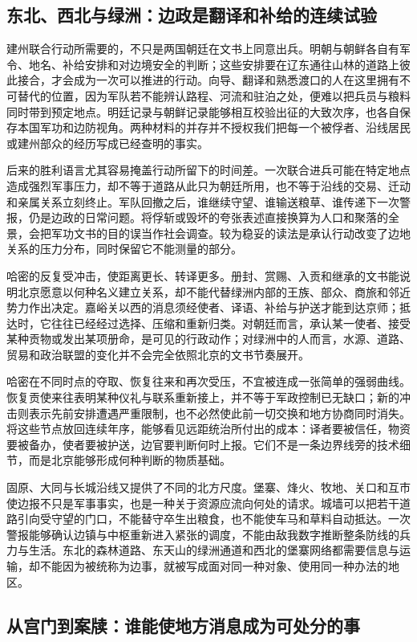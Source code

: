 \subsection{东北、西北与绿洲：边政是翻译和补给的连续试验}

建州联合行动所需要的，不只是两国朝廷在文书上同意出兵。明朝与朝鲜各自有军令、地名、补给安排和对边境安全的判断；这些安排要在辽东通往山林的道路上彼此接合，才会成为一次可以推进的行动。向导、翻译和熟悉渡口的人在这里拥有不可替代的位置，因为军队若不能辨认路程、河流和驻泊之处，便难以把兵员与粮料同时带到预定地点。明廷记录与朝鲜记录能够相互校验出征的大致次序，也各自保存本国军功和边防视角。两种材料的并存并不授权我们把每一个被俘者、沿线居民或建州部众的经历写成已经查明的事实。

后来的胜利语言尤其容易掩盖行动所留下的时间差。一次联合进兵可能在特定地点造成强烈军事压力，却不等于道路从此只为朝廷所用，也不等于沿线的交易、迁动和亲属关系立刻终止。军队回撤之后，谁继续守望、谁输送粮草、谁传递下一次警报，仍是边政的日常问题。将俘斩或毁坏的夸张表述直接换算为人口和聚落的全景，会把军功文书的目的误当作社会调查。较为稳妥的读法是承认行动改变了边地关系的压力分布，同时保留它不能测量的部分。

哈密的反复受冲击，使距离更长、转译更多。册封、赏赐、入贡和继承的文书能说明北京愿意以何种名义建立关系，却不能代替绿洲内部的王族、部众、商旅和邻近势力作出决定。嘉峪关以西的消息须经使者、译语、补给与护送才能到达京师；抵达时，它往往已经经过选择、压缩和重新归类。对朝廷而言，承认某一使者、接受某种贡物或发出某项册命，是可见的行政动作；对绿洲中的人而言，水源、道路、贸易和政治联盟的变化并不会完全依照北京的文书节奏展开。

哈密在不同时点的夺取、恢复往来和再次受压，不宜被连成一张简单的强弱曲线。恢复贡使来往表明某种仪礼与联系重新接上，并不等于军政控制已无缺口；新的冲击则表示先前安排遭遇严重限制，也不必然使此前一切交换和地方协商同时消失。将这些节点放回连续年序，能够看见远距统治所付出的成本：译者要被信任，物资要被备办，使者要被护送，边官要判断何时上报。它们不是一条边界线旁的技术细节，而是北京能够形成何种判断的物质基础。

固原、大同与长城沿线又提供了不同的北方尺度。堡寨、烽火、牧地、关口和互市使边报不只是军事事实，也是一种关于资源应流向何处的请求。城墙可以把若干道路引向受守望的门口，不能替守卒生出粮食，也不能使车马和草料自动抵达。一次警报能够确认边镇与中枢重新进入紧张的调度，不能由敌我数字推断整条防线的兵力与生活。东北的森林道路、东天山的绿洲通道和西北的堡寨网络都需要信息与运输，却不能因为被统称为边事，就被写成面对同一种对象、使用同一种办法的地区。

\subsection{从宫门到案牍：谁能使地方消息成为可处分的事}

